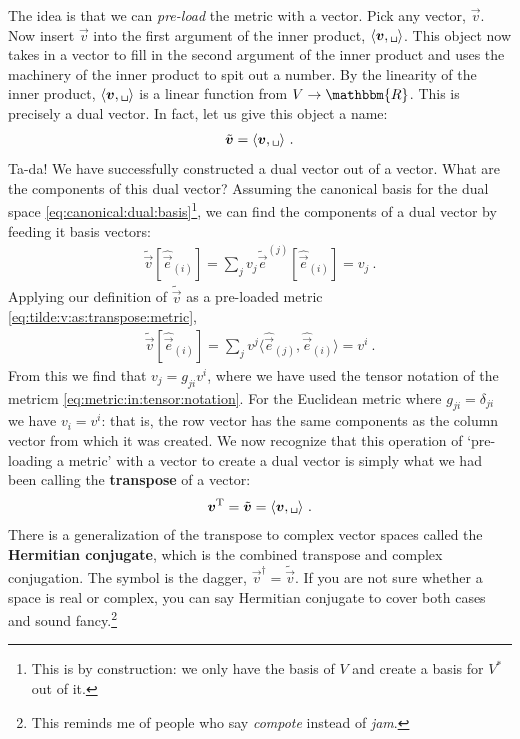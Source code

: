 \documentclass[
  11pt,
	colorful,
	raggedright,
]{tufte-style-thesis-flip}
\begin{document}
The idea is that we can \emph{pre-load} the metric with a vector. Pick any vector, $\vec{v}$. Now insert $\vec v$ into the first argument of the inner product, $\langle \vec v , \texttt{\textvisiblespace}\rangle$. This object now takes in a vector to fill in the second argument of the inner product and uses the machinery of the inner product to spit out a number. By the linearity of the inner product, $\langle \vec v , \texttt{\textvisiblespace}\rangle$ is a linear function from $V\to \mathbbm{R}$. This is precisely a dual vector. In fact, let us give this object a name:
\begin{align}
  \tilde{\vec v} = \langle \vec v , \texttt{\textvisiblespace}\rangle \ .
  \label{eq:tilde:v:as:transpose:metric}
\end{align}
Ta-da! We have successfully constructed a dual vector out of a vector. What are the components of this dual vector? Assuming the canonical basis for the dual space \eqref{eq:canonical:dual:basis}\footnote{This is by construction: we only have the basis of $V$ and create a basis for $V^*$ out of it.}, we can find the components of a dual vector by feeding it basis vectors:
\begin{align}
  \tilde{\vec v}\left[\hat{\vec e}_{(i)}\right]
  = 
  \sum_j v_j \tilde{\vec e}^{(j)} \left[\hat{\vec e}_{(i)}\right]
  = 
  v_j \ .
\end{align}
Applying our definition of $\tilde{\vec v}$ as a pre-loaded metric \eqref{eq:tilde:v:as:transpose:metric},
\begin{align}
\tilde{\vec v}\left[\hat{\vec e}_{(i)}\right]
= 
\sum_j v^j \langle\hat{\vec e}_{(j)},\hat{\vec e}_{(i)}\rangle  
= v^i \ .
\end{align}
From this we find that $v_j = g_{ji} v^i$, where we have used the tensor notation of the metricm \eqref{eq:metric:in:tensor:notation}. For the Euclidean metric where $g_{ji} = \delta_{ji}$ we have $v_i = v^i$: that is, the row vector has the same components as the column vector from which it was created. We now recognize that this operation of `pre-loading a metric' with a vector to create a dual vector is simply what we had been calling the \textbf{transpose} of a vector:
\begin{align}
  \vec v^\text{T} = \tilde{\vec v} = \langle \vec v , \texttt{\textvisiblespace}\rangle \ .
  \label{eq:transpose:as:inner:product:preloaded}
\end{align}
There is a generalization of the transpose to complex vector spaces called the \textbf{Hermitian conjugate}, which is the combined transpose and complex conjugation. The symbol is the dagger, $\vec{v}^\dag = \tilde{\vec v}$. If you are not sure whether a space is real or complex, you can say Hermitian conjugate to cover both cases and sound fancy.\footnote{This reminds me of people who say \emph{compote} instead of \emph{jam}.}
\end{document}
